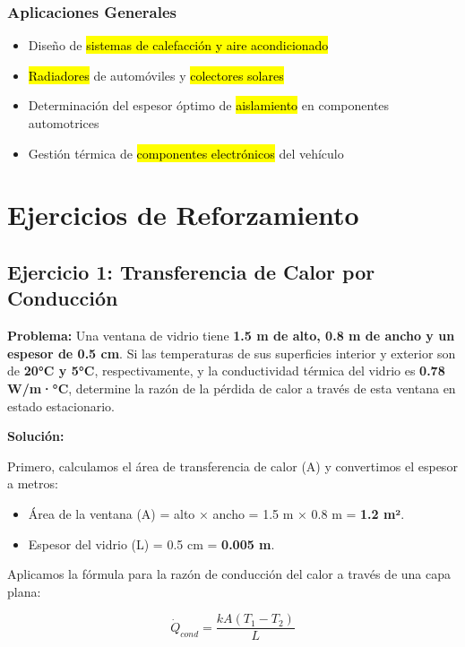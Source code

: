 \documentclass{article}
\begin{document}
    \subsubsection{Aplicaciones Generales}
    \begin{itemize}
        \item Diseño de \hl{sistemas de calefacción y aire acondicionado}
        \item \hl{Radiadores} de automóviles y \hl{colectores solares}
        \item Determinación del espesor óptimo de \hl{aislamiento} en componentes automotrices
        \item Gestión térmica de \hl{componentes electrónicos} del vehículo
    \end{itemize}

    \section{Ejercicios de Reforzamiento}

    \subsection{Ejercicio 1: Transferencia de Calor por Conducción}

    \textbf{Problema:} Una ventana de vidrio tiene \textbf{1.5 m de alto, 0.8 m de ancho y un espesor de 0.5 cm}. Si las temperaturas de sus superficies interior y exterior son de \textbf{20°C y 5°C}, respectivamente, y la conductividad térmica del vidrio es \textbf{0.78 W/m·°C}, determine la razón de la pérdida de calor a través de esta ventana en estado estacionario.

    \textbf{Solución:}

    Primero, calculamos el área de transferencia de calor (A) y convertimos el espesor a metros:

    \begin{itemize}
        \item Área de la ventana (A) = alto × ancho = 1.5 m × 0.8 m = \textbf{1.2 m²}.
        \item Espesor del vidrio (L) = 0.5 cm = \textbf{0.005 m}.
    \end{itemize}

    Aplicamos la fórmula para la razón de conducción del calor a través de una capa plana: 

    \begin{equation}
    \dot{Q}_{cond} = \frac{kA (T_1 - T_2)}{L}
    \end{equation}
\end{document}
